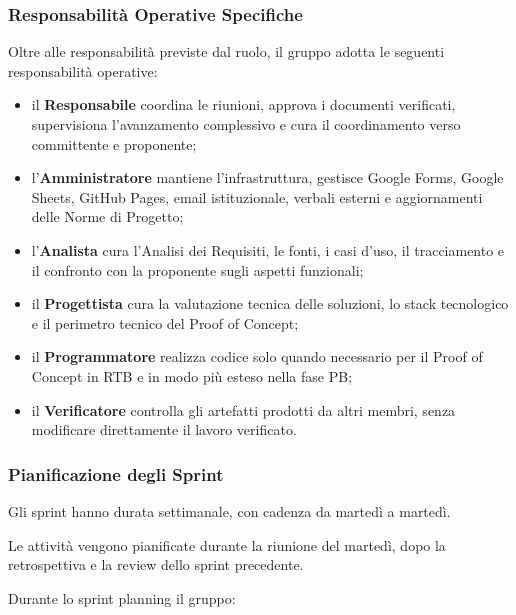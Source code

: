 \subsubsection{Responsabilità Operative Specifiche}

Oltre alle responsabilità previste dal ruolo, il gruppo adotta le seguenti
responsabilità operative:

\begin{itemize}
    \item il \textbf{Responsabile} coordina le riunioni, approva i documenti
    verificati, supervisiona l'avanzamento complessivo e cura il coordinamento
    verso committente e proponente;

    \item l'\textbf{Amministratore} mantiene l'infrastruttura, gestisce Google
    Forms, Google Sheets, GitHub Pages,
    email istituzionale, verbali esterni e aggiornamenti delle Norme di Progetto;

    \item l'\textbf{Analista} cura l'Analisi dei Requisiti, le fonti, i casi d'uso,
    il tracciamento e il confronto con la proponente sugli aspetti funzionali;

    \item il \textbf{Progettista} cura la valutazione tecnica delle soluzioni,
    lo stack tecnologico e il perimetro tecnico del Proof of Concept;

    \item il \textbf{Programmatore} realizza codice solo quando necessario per il
    Proof of Concept in RTB e in modo più esteso nella fase PB;

    \item il \textbf{Verificatore} controlla gli artefatti prodotti da altri membri,
    senza modificare direttamente il lavoro verificato.
\end{itemize}


\subsubsection{Pianificazione degli Sprint}

Gli sprint hanno durata settimanale, con cadenza da martedì a martedì.

Le attività vengono pianificate durante la riunione del martedì, dopo la
retrospettiva e la review dello sprint precedente.

Durante lo sprint planning il gruppo:

